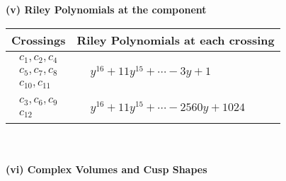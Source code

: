 \documentclass[1p]{elsarticle_modified}
\theoremstyle{definition}
\begin{document}
\newpage\renewcommand{\arraystretch}{1}
\flushleft \textbf{(v) Riley Polynomials at the component}\newline \\
\begin{tabular}{m{50pt}|m{274pt}}
Crossings & \hspace{64pt}Riley Polynomials at each crossing \\
\hline $$\begin{aligned}c_{1},c_{2},c_{4}\\c_{5},c_{7},c_{8}\\c_{10},c_{11}\end{aligned}$$&$\begin{aligned}
&y^{16}+11 y^{15}+\cdots-3 y+1
\end{aligned}$\\
\hline $$\begin{aligned}c_{3},c_{6},c_{9}\\c_{12}\end{aligned}$$&$\begin{aligned}
&y^{16}+11 y^{15}+\cdots-2560 y+1024
\end{aligned}$\\
\hline
\end{tabular}\\~\\
\newpage\flushleft \textbf{(vi) Complex Volumes and Cusp Shapes}
\end{document}
